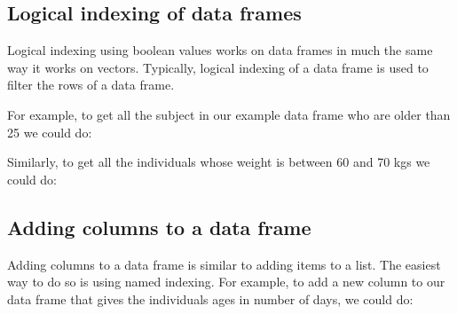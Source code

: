 \documentclass[]{book}
\newenvironment{Shaded}{\begin{snugshade}}{\end{snugshade}}
\newcommand{\AlertTok}[1]{\textcolor[rgb]{0.94,0.16,0.16}{#1}}
\newcommand{\CommentTok}[1]{\textcolor[rgb]{0.56,0.35,0.01}{\textit{#1}}}
\newcommand{\DecValTok}[1]{\textcolor[rgb]{0.00,0.00,0.81}{#1}}
\newcommand{\NormalTok}[1]{#1}
\newcommand{\OperatorTok}[1]{\textcolor[rgb]{0.81,0.36,0.00}{\textbf{#1}}}
\newcommand{\StringTok}[1]{\textcolor[rgb]{0.31,0.60,0.02}{#1}}
\theoremstyle{definition}
\theoremstyle{definition}
\theoremstyle{definition}
\theoremstyle{remark}
\begin{document}
\hypertarget{logical-indexing-of-data-frames}{%
\subsection{Logical indexing of data
frames}\label{logical-indexing-of-data-frames}}

Logical indexing using boolean values works on data frames in much the
same way it works on vectors. Typically, logical indexing of a data
frame is used to filter the rows of a data frame.

For example, to get all the subject in our example data frame who are
older than 25 we could do:

\begin{Shaded}
\end{Shaded}

Similarly, to get all the individuals whose weight is between 60 and 70
kgs we could do:

\begin{Shaded}
\end{Shaded}

\hypertarget{adding-columns-to-a-data-frame}{%
\subsection{Adding columns to a data
frame}\label{adding-columns-to-a-data-frame}}

Adding columns to a data frame is similar to adding items to a list. The
easiest way to do so is using named indexing. For example, to add a new
column to our data frame that gives the individuals ages in number of
days, we could do:
\end{document}

